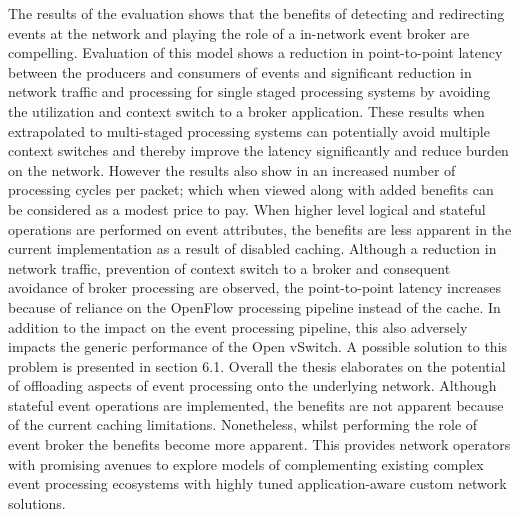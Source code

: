 The results of the evaluation shows that the benefits of detecting and redirecting events at the network and playing the role of a in-network event broker are compelling. Evaluation of this model shows a reduction in point-to-point latency between the  producers and consumers of events and significant reduction in network traffic and processing for single staged processing systems by avoiding the utilization and context switch to a broker application. These results when extrapolated to multi-staged processing systems can potentially avoid multiple context switches and thereby improve the latency significantly and reduce burden on the network. However the results also show in an increased number of processing cycles per packet; which when viewed along with added benefits can be considered as a modest price to pay. When higher level logical and stateful operations are performed on event attributes, the benefits are less apparent in the current implementation as a result of disabled caching. Although a reduction in network traffic, prevention of context switch to a broker and consequent avoidance of broker processing are observed, the point-to-point latency increases because of reliance on the OpenFlow processing pipeline instead of the cache. In addition to the impact on the event processing pipeline, this also adversely impacts the generic performance of the Open vSwitch. A possible solution to this problem is presented in section 6.1. Overall the thesis elaborates on the potential of offloading aspects of event processing onto the underlying network. Although stateful event operations are implemented, the benefits are not apparent because of the current caching limitations. Nonetheless, whilst performing the role of event broker the benefits become more apparent. This provides network operators with promising avenues to explore models of complementing existing complex event processing ecosystems with highly tuned application-aware custom network solutions.

